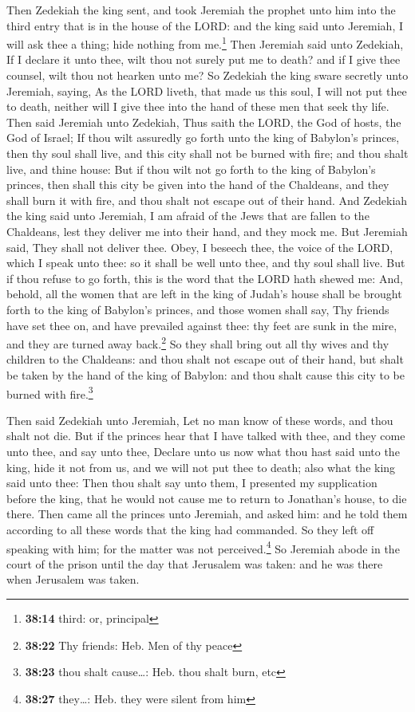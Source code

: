  Then Zedekiah the king sent, and took Jeremiah the
prophet unto him into the third entry that is in the house of the LORD:
and the king said unto Jeremiah, I will ask thee a thing; hide nothing
from me.\footnote{\textbf{38:14} third: or, principal} 
Then Jeremiah said unto Zedekiah, If I declare it unto thee, wilt thou
not surely put me to death? and if I give thee counsel, wilt thou not
hearken unto me?  So Zedekiah the king sware secretly
unto Jeremiah, saying, As the LORD liveth, that made us this soul, I
will not put thee to death, neither will I give thee into the hand of
these men that seek thy life.  Then said Jeremiah unto
Zedekiah, Thus saith the LORD, the God of hosts, the God of Israel; If
thou wilt assuredly go forth unto the king of Babylon's princes, then
thy soul shall live, and this city shall not be burned with fire; and
thou shalt live, and thine house:  But if thou wilt not
go forth to the king of Babylon's princes, then shall this city be given
into the hand of the Chaldeans, and they shall burn it with fire, and
thou shalt not escape out of their hand.  And Zedekiah
the king said unto Jeremiah, I am afraid of the Jews that are fallen to
the Chaldeans, lest they deliver me into their hand, and they mock me.
 But Jeremiah said, They shall not deliver thee. Obey, I
beseech thee, the voice of the LORD, which I speak unto thee: so it
shall be well unto thee, and thy soul shall live.  But if
thou refuse to go forth, this is the word that the LORD hath shewed me:
 And, behold, all the women that are left in the king of
Judah's house shall be brought forth to the king of Babylon's princes,
and those women shall say, Thy friends have set thee on, and have
prevailed against thee: thy feet are sunk in the mire, and they are
turned away back.\footnote{\textbf{38:22} Thy friends: Heb. Men of thy
  peace}  So they shall bring out all thy wives and thy
children to the Chaldeans: and thou shalt not escape out of their hand,
but shalt be taken by the hand of the king of Babylon: and thou shalt
cause this city to be burned with fire.\footnote{\textbf{38:23} thou
  shalt cause\ldots: Heb. thou shalt burn, etc}

 Then said Zedekiah unto Jeremiah, Let no man know of
these words, and thou shalt not die.  But if the princes
hear that I have talked with thee, and they come unto thee, and say unto
thee, Declare unto us now what thou hast said unto the king, hide it not
from us, and we will not put thee to death; also what the king said unto
thee:  Then thou shalt say unto them, I presented my
supplication before the king, that he would not cause me to return to
Jonathan's house, to die there.  Then came all the
princes unto Jeremiah, and asked him: and he told them according to all
these words that the king had commanded. So they left off speaking with
him; for the matter was not perceived.\footnote{\textbf{38:27}
  they\ldots: Heb. they were silent from him}  So
Jeremiah abode in the court of the prison until the day that Jerusalem
was taken: and he was there when Jerusalem was taken.

